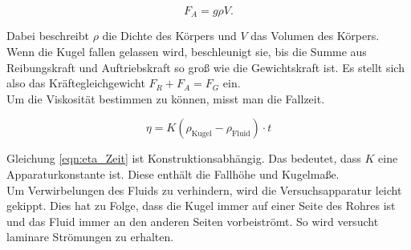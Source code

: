 \begin{equation*}
    F_A = g \rho V.
\end{equation*}

\noindent
Dabei beschreibt $\rho$ die Dichte des Körpers und $V$ das Volumen des Körpers.\\
\noindent
Wenn die Kugel fallen gelassen wird, beschleunigt sie, bis die Summe aus Reibungskraft und Auftriebskraft so groß wie die Gewichtskraft 
ist. Es stellt sich also das Kräftegleichgewicht $F_R + F_A = F_G$ ein.\\
\noindent
Um die Viskosität bestimmen zu können, misst man die Fallzeit.

\begin{equation}
    \eta = K(\rho_\text{Kugel} - \rho_\text{Fluid}) \cdot t
    \label{eqn:eta_Zeit}
\end{equation}

\noindent
Gleichung \eqref{eqn:eta_Zeit} ist Konstruktionsabhängig. Das bedeutet, dass $K$ eine Apparaturkonstante ist. Diese enthält die Fallhöhe 
und Kugelmaße.\\

\noindent
Um Verwirbelungen des Fluids zu verhindern, wird die Versuchsapparatur leicht gekippt. Dies hat zu Folge, dass die Kugel immer auf einer 
Seite des Rohres ist und das Fluid immer an den anderen Seiten vorbeiströmt. So wird versucht laminare Strömungen zu erhalten.

%